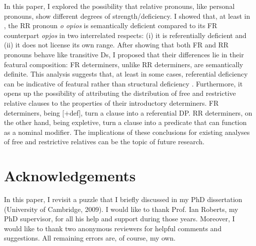 \documentclass[output=paper]{langsci/langscibook}
\begin{document}
In this paper, I explored the possibility that relative pronouns, like personal
pronouns, show different degrees of strength/deficiency. I showed that, at
least in , the \gls{RR} pronoun \emph{o opios} is semantically deficient
compared to its \gls{FR} counterpart \emph{opjos} in two interrelated respects:
(i) it is referentially deficient and (ii) it does not license its own range.
After showing that both \gls{FR} and \gls{RR} pronouns behave like transitive
Ds, I proposed that their differences lie in their featural composition:
\gls{FR} determiners, unlike \gls{RR} determiners, are semantically definite. This
analysis suggests that, at least in some cases, referential deficiency can be
indicative of featural rather than structural deficiency
\parencite[cf.][]{CarSta1999,DecWil2002}.  Furthermore, it opens up the
possibility of attributing the distribution of free and restrictive relative
clauses to the properties of their introductory determiners. \gls{FR}
determiners, being [$+$def], turn a clause into a referential DP. \gls{RR}
determiners, on the other hand, being expletive, turn a clause into a predicate
that can function as a nominal modifier. The implications of these conclusions
for existing analyses of free and restrictive relatives can be the topic of
future research.

\printchapterglossary{}

\section*{Acknowledgements}

In this paper, I revisit a puzzle that I briefly discussed in my PhD
dissertation (University of Cambridge, 2009). I would like to thank Prof. Ian
Roberts, my PhD supervisor, for all his help and support during those years.
Moreover, I would like to thank two anonymous reviewers for helpful comments
and suggestions. All remaining errors are, of course, my own.

{\sloppy\printbibliography[heading=subbibliography,notkeyword=this]}
\end{document}
